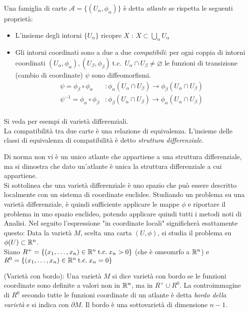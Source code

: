 Una famiglia di carte $\mathcal{A} = \{ (U_\alpha , \phi_\alpha) \}$ è detta
\emph{atlante} se rispetta le seguenti proprietà:
\begin{itemize}
    \item L'insieme degli intorni $\{U_\alpha\}$ ricopre $X$ :
        $X \subset \bigcup \limits_\alpha U_\alpha$
    \item Gli intorni coordinati sono a due a due \emph{compatibili}: per ogni coppia
    di intorni coordinati
       $(U_\alpha , \phi_\alpha), (U_\beta , \phi_\beta) \mathrm{\:t.c.\:} \:
       U_\alpha \cap U_\beta \neq \varnothing $
    le funzioni di transizione (cambio di coordinate) $\psi$ sono diffeomorfismi.
    \begin{equation*}
        \begin{split}
           \psi = \phi_\beta \circ \phi_\alpha &: \phi_\alpha(U_\alpha \cap U_\beta)
              \to \phi_\beta (U_\alpha \cap U_\beta) \\
           \psi^{-1} = \phi_\alpha \circ \phi_\beta &: \phi_\beta(U_\alpha \cap U_\beta)
              \to \phi_\alpha (U_\alpha \cap U_\beta) \\
        \end{split}
    \end{equation*}
\end{itemize}
Si veda \cite{sernesi} per esempi di varietà differenziali.\\

La compatibilità tra due carte è una relazione di equivalenza. L'insieme delle
classi di equivalenza di compatibilità è detto \emph{struttura differenziale}.

Di norma non vi è un unico atlante che appartiene a una struttura differenziale,
ma si dimostra che dato un'atlante è unica la struttura differenziale a cui appartiene.\\

Si sottolinea che una varietà differenziale è uno spazio che può essere descritto
localmente con un sistema di coordinate euclidee. Studiando un problema su una
varietà differenziale, è quindi sufficiente applicare le mappe $\phi$ e riportare
il problema in uno spazio euclideo, potendo applicare quindi tutti i metodi
noti di Analisi. Nel seguito l'espressione "in coordinate locali" significherà esattamente
questo: Data la varietà $M$, scelta una carta $(U,\phi)$, si studia il problema
su $\phi(U) \subset \mathbb{R} ^n$.\\

Siano $R^+ = \{(x_1, \dots, x_n) \in \mathbb{R}^n \mathrm{\: t.c. \:} x_n > 0 \}$ (che è omeomrfo a $\mathbb{R}^n$) e
$R^0 = \{(x_1, \dots, x_n) \in \mathbb{R}^n \mathrm{\: t.c. \:} x_n = 0 \}$
\begin{definition}{(Varietà con bordo):}
   Una varietà $M$ si dice varietà con bordo se le funzioni coordinate sono definite
   a valori non in $\mathbb{R}^n$, ma in $R^+ \cup R^0$. La controimmagine di $R^0$ secondo
   tutte le funzioni coordinate di un atlante è detta \emph{bordo della varietà}
   e si indica con $\partial M$. Il bordo è una sottovarietà di dimensione $n-1$.
\end{definition}

